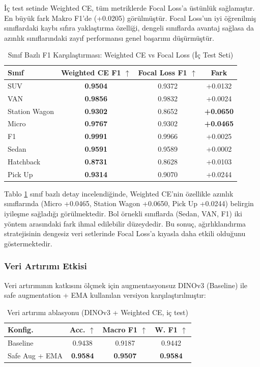 \documentclass[conference]{IEEEtran}
\begin{document}
İç test setinde Weighted CE, tüm metriklerde Focal Loss'a üstünlük sağlamıştır. En büyük fark Makro F1'de (+0.0205) görülmüştür. Focal Loss'un iyi öğrenilmiş sınıflardaki kaybı sıfıra yaklaştırma özelliği, dengeli sınıflarda avantaj sağlasa da azınlık sınıflarındaki zayıf performansı genel başarımı düşürmüştür.

\begin{table}[h]
\centering
\caption{Sınıf Bazlı F1 Karşılaştırması: Weighted CE vs Focal Loss (İç Test Seti)}
\label{tab:class_f1_comparison}
\begin{tabular}{@{}lccc@{}}
\toprule
\textbf{Sınıf} & \textbf{Weighted CE F1 $\uparrow$} & \textbf{Focal Loss F1 $\uparrow$} & \textbf{Fark} \\ \midrule
SUV & \textbf{0.9504} & 0.9372 & +0.0132 \\
VAN & \textbf{0.9856} & 0.9832 & +0.0024 \\
Station Wagon & \textbf{0.9302} & 0.8652 & \textbf{+0.0650} \\
Micro & \textbf{0.9767} & 0.9302 & \textbf{+0.0465} \\
F1 & \textbf{0.9991} & 0.9966 & +0.0025 \\
Sedan & \textbf{0.9591} & 0.9589 & +0.0002 \\
Hatchback & \textbf{0.8731} & 0.8628 & +0.0103 \\
Pick Up & \textbf{0.9314} & 0.9070 & +0.0244 \\ \bottomrule
\end{tabular}
\end{table}

Tablo \ref{tab:class_f1_comparison} sınıf bazlı detay incelendiğinde, Weighted CE'nin özellikle azınlık sınıflarında (Micro +0.0465, Station Wagon +0.0650, Pick Up +0.0244) belirgin iyileşme sağladığı görülmektedir. Bol örnekli sınıflarda (Sedan, VAN, F1) iki yöntem arasındaki fark ihmal edilebilir düzeydedir. Bu sonuç, ağırlıklandırma stratejisinin dengesiz veri setlerinde Focal Loss'a kıyasla daha etkili olduğunu göstermektedir.

\subsubsection{Veri Artırımı Etkisi}
Veri artırımının katkısını ölçmek için augmentasyonsuz DINOv3 (Baseline) ile safe augmentation + EMA kullanılan versiyon karşılaştırılmıştır:

\begin{table}[h]
\centering
\scriptsize
\caption{Veri artırımı ablasyonu (DINOv3 + Weighted CE, iç test)}
\label{tab:aug_ablation}
\begin{tabular}{@{}lccc@{}}
\toprule
\textbf{Konfig.} & \textbf{Acc. $\uparrow$} & \textbf{Macro F1 $\uparrow$} & \textbf{W. F1 $\uparrow$} \\ \midrule
Baseline & 0.9438 & 0.9187 & 0.9442 \\
Safe Aug + EMA & \textbf{0.9584} & \textbf{0.9507} & \textbf{0.9584} \\ \bottomrule
\end{tabular}
\end{table}
\end{document}
